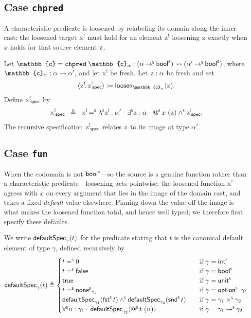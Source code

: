 \subsection{Case \texttt{chpred}}\label{case:chpred}
A characteristic predicate is loosened by relabeling its domain along the inner cast: the loosened target $\lvar{x}$ must hold for an element $\lvar{z}$ loosening $\var{z}$ exactly when $x$ holds for that source element $\var{z}$.

\begin{definition}
Let $\mathbb{c} = \mathtt{chpred}\;\mathbb{c}_\alpha : \castpath{(\alpha \toS \boolS)}{(\alpha' \toS \boolS)}$, where $\mathbb{c}_\alpha : \castpath{\alpha}{\alpha'}$, and let $\lvar{x}$ be fresh. Let $\var{z}:\alpha$ be fresh and set
\[
  \langle\lvar{z},\spec{\lvar{z}}\rangle
  \coloneq \mathsf{loosen}_{\mathbb{c}_\alpha}(\var{z}).
\]
Define $\spec{\lvar{x}}$ by
\[
\spec{\lvar{x}} \;\;\triangleq\;\; \lvar{x} \eqS \lamS \lvar{z} : \alpha' \cdot\, \existsS \var{z} : \alpha\cdot\, \appS x (\var{z}) \andS \spec{\lvar{z}}.
\]
The recursive specification $\spec{\lvar{z}}$ relates $\var{z}$ to its image at type $\alpha'$.
\end{definition}

\subsection{Case \texttt{fun}}\label{case:fun}
When the codomain is not $\mathsf{bool}^{\scriptscriptstyle{\mathsf{S}}}$---so the source is a genuine function rather than a characteristic predicate---loosening acts pointwise: the loosened function $\lvar{x}$ agrees with $x$ on every argument that lies in the image of the domain cast, and takes a fixed \emph{default} value elsewhere. Pinning down the value off the image is what makes the loosened function total, and hence well typed; we therefore first specify these defaults.

We write $\mathsf{defaultSpec}_{\gamma}(t)$ for the predicate stating
that $t$ is the canonical default element of type $\gamma$, defined recursively by
\[
\mathsf{defaultSpec}_{\gamma}(t) \triangleq
\begin{cases}
t \eqS 0 & \text{if } \gamma = \intS\\
t \eqS \mathsf{false} & \text{if } \gamma = \boolS\\
\mathsf{true} & \text{if } \gamma = \unitS\\
t \eqS \noneS_{\gamma_1} & \text{if } \gamma = \optS\ \gamma_1\\
\begin{aligned}[t]
&\mathsf{defaultSpec}_{\gamma_1}(\fstS t) \andS \mathsf{defaultSpec}_{\gamma_2}(\sndS t)
\end{aligned} & \text{if } \gamma = \gamma_1 \timesS \gamma_2\\
\forallS \var{u} : \gamma_1\cdot\, \mathsf{defaultSpec}_{\gamma_2}(\appS t (\var{u})) & \text{if } \gamma = \gamma_1 \toS \gamma_2
\end{cases}
\]

